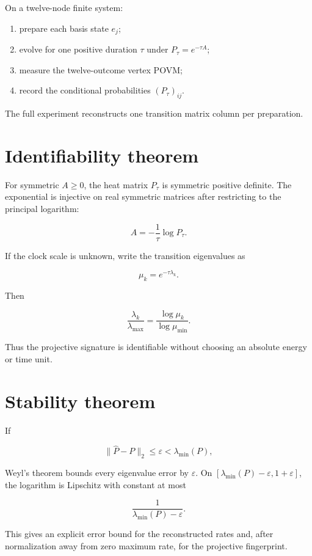 \documentclass[11pt,a4paper,openany]{report}
\begin{document}
On a twelve-node finite system:

\begin{enumerate}
\item 
prepare each basis state \(e_j\);

\item 
evolve for one positive duration \(\tau\) under \(P_\tau=e^{-\tau A}\);

\item 
measure the twelve-outcome vertex POVM;

\item 
record the conditional probabilities \((P_\tau)_{ij}\).

\end{enumerate}

The full experiment reconstructs one transition matrix column per preparation.

\section{Identifiability theorem}

For symmetric \(A\ge0\), the heat matrix \(P_\tau\) is symmetric positive definite. The exponential is injective on real symmetric matrices after restricting to the principal logarithm:

\[
A=-\frac1\tau\log P_\tau.
\]

If the clock scale is unknown, write the transition eigenvalues as

\[
\mu_k=e^{-\tau\lambda_k}.
\]

Then

\[
\frac{\lambda_k}{\lambda_{\max}}
=
\frac{\log\mu_k}{\log\mu_{\min}}.
\]

Thus the projective signature is identifiable without choosing an absolute energy or time unit.

\section{Stability theorem}

If

\[
\|\widehat P-P\|_2\le\varepsilon
<
\lambda_{\min}(P),
\]

Weyl's theorem bounds every eigenvalue error by \(\varepsilon\). On \([\lambda_{\min}(P)-\varepsilon,1+\varepsilon]\), the logarithm is Lipschitz with constant at most

\[
\frac1{\lambda_{\min}(P)-\varepsilon}.
\]

This gives an explicit error bound for the reconstructed rates and, after normalization away from zero maximum rate, for the projective fingerprint.
\end{document}
